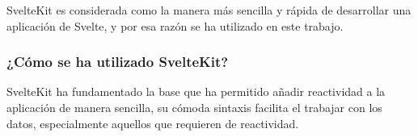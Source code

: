 SvelteKit es considerada como la manera más sencilla y rápida de desarrollar una aplicación de Svelte, y por esa razón se ha utilizado en este trabajo.

\subsubsection{¿Cómo se ha utilizado SvelteKit?}
SvelteKit ha fundamentado la base que ha permitido añadir reactividad a la aplicación de manera sencilla, su cómoda sintaxis facilita el trabajar con los datos, especialmente aquellos que requieren de reactividad.

